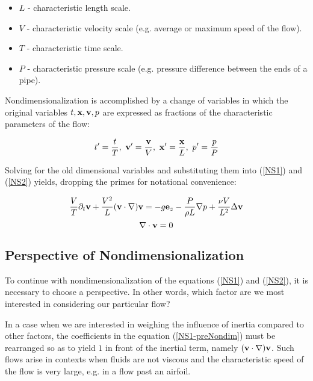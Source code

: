 \begin{itemize}

\item[] $ L $ - characteristic length scale.
\item[] $ V $ - characteristic velocity scale (e.g. average or maximum speed of the flow).
\item[] $ T $ - characteristic time scale.
\item[] $ P $ - characteristic pressure scale (e.g. pressure difference between the ends of a pipe).

\end{itemize}

Nondimensionalization is accomplished by a change of variables in which the original variables $t, \mathbf{x}, \mathbf{v}, p$ are expressed as fractions of the characteristic parameters of the flow:

$$ t^{\prime}  = \frac{t}{T},~ \mathbf{v^{\prime}} = \frac{\mathbf{v}}{V},~ \mathbf{x^{\prime}} = \frac{\mathbf{x}}{L},~ p^{\prime} = \frac{p}{P} $$ 

Solving for the old dimensional variables and substituting them into (\ref{NS1}) and (\ref{NS2}) yields, dropping the primes for notational convenience:

\begin{equation} \label{NS1-preNondim}
\frac{V}{T} \partial_t\mathbf{v} + \frac{V^2}{L} (\mathbf{v} \cdot \nabla)\mathbf{v} = -g\mathbf{e}_z - \frac{P}{\rho L}\nabla p + \frac{\nu V}{L^2}\Delta\mathbf{v} 
\end{equation}
\begin{equation} \label{NS2-preNondim}
\nabla\cdot\mathbf{v} = 0 
\end{equation}

\subsection{Perspective of Nondimensionalization} \label{perspective}

To continue with nondimensionalization of the equations (\ref{NS1}) and (\ref{NS2}), it is necessary to choose a perspective. In other words, which factor are we most interested in considering our particular flow? 

In a case when we are interested in weighing the influence of inertia compared to other factors, the coefficients in the equation (\ref{NS1-preNondim}) must be rearranged so as to yield $1$ in front of the inertial term, namely $(\mathbf{v} \cdot \nabla)\mathbf{v}$. Such flows arise in contexts when fluids are not viscous and the characteristic speed of the flow is very large, e.g. in a flow past an airfoil.

